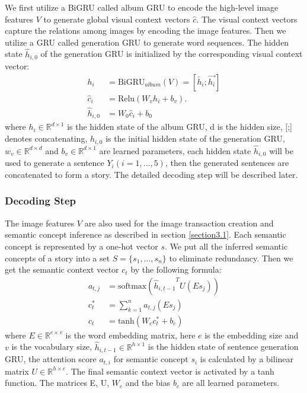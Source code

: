 \documentclass[sigconf]{acmart}
\begin{document}
We first utilize a BiGRU called album GRU to encode the high-level image features $V$ to generate global visual context vectors $\hat{c}$. The visual context vectors capture the relations among images by encoding the image features. Then we utilize a GRU called generation GRU to generate word sequences. The hidden state $\hat{h}_{i,0}$ of the generation GRU is initialized by the corresponding visual context vector:
\begin{align}
    h_i &= \text{BiGRU}_{album}(V) = [\overleftarrow{h_i};\overrightarrow{h_i}]\\
    \hat{c}_i &= \text{Relu}(W_v h_i+b_v).\\
    \hat{h}_{i,0} &= W_0\hat{c}_i+b_0
\end{align}
where $h_i\in\mathbb{R}^{d\times 1}$ is the hidden state of the album GRU, d is the hidden size, [;] denotes concatenating, $\hat{h}_{i,0}$ is the initial hidden state of the generation GRU, $w_v\in\mathbb{R}^{d\times d}$ and $b_v\in\mathbb{R}^{d\times 1}$ are learned parameters, each hidden state $\hat{h}_{i,0}$ will be used to generate a sentence $Y_i (i=1,...,5)$, then the generated sentences are concatenated to form a story. The detailed decoding step will be described later. 

\subsubsection{Decoding Step}
The image features $V$ are also used for the image transaction creation and semantic concept inference as described in section \ref{section3.1}. Each semantic concept is represented by a one-hot vector $s$. We put all the inferred semantic concepts of a story into a set $S=\{s_1,..., s_n\}$ to eliminate redundancy. Then we get the semantic context vector $c_t$ by the following formula:
\begin{align}
    a_{t,j} &= \text{softmax}({\hat{h}_{i,t-1}}^TU(Es_j)) \\
    c_t^* &= \sum_{k=1}^{n}a_{t,j}(Es_j) \\
    c_t &= \text{tanh}(W_cc_t^*+b_c)
\end{align}
where $E\in\mathbb{R}^{e\times v}$ is the word embedding matrix, here $e$ is the embedding size and $v$ is the vocabulary size, $\hat{h}_{i,t-1}\in\mathbb{R}^{h\times 1}$ is the hidden state of sentence generation GRU, the attention score $a_{t,i}$ for semantic concept $s_i$ is calculated by a bilinear matrix $U\in\mathbb{R}^{h\times e}$. The final semantic context vector is activated by a tanh function. The matrices E, U, $W_c$ and the bias $b_c$ are all learned parameters.
\end{document}
